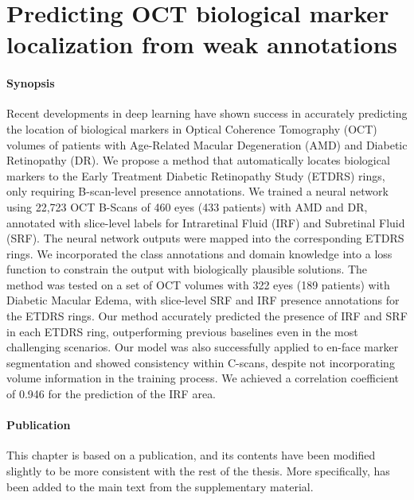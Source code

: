 \graphicspath{{ch3_oct_localization/}{Figures/}}

\chapter{Predicting OCT biological marker localization from weak annotations}
\label{chapter:oct}


\subsubsection{Synopsis}Recent developments in deep learning have shown success in accurately predicting the location of biological markers in Optical Coherence Tomography (OCT) volumes of patients with Age-Related Macular Degeneration (AMD) and Diabetic Retinopathy (DR). We propose a method that automatically locates biological markers to the Early Treatment Diabetic Retinopathy Study (ETDRS) rings, only requiring B-scan-level presence annotations. We trained a neural network using 22,723 OCT B-Scans of 460 eyes (433 patients) with AMD and DR, annotated with slice-level labels for Intraretinal Fluid (IRF) and Subretinal Fluid (SRF). The neural network outputs were mapped into the corresponding ETDRS rings. We incorporated the class annotations and domain knowledge into a loss function to constrain the output with biologically plausible solutions. The method was tested on a set of OCT volumes with 322 eyes (189 patients) with Diabetic Macular Edema, with slice-level SRF and IRF presence annotations for the ETDRS rings. Our method accurately predicted the presence of IRF and SRF in each ETDRS ring, outperforming previous baselines even in the most challenging scenarios. Our model was also successfully applied to en-face marker segmentation and showed consistency within C-scans, despite not incorporating volume information in the training process. We achieved a correlation coefficient of 0.946 for the prediction of the IRF area. 

\subsubsection{Publication}This chapter is based on a publication, and its contents have been modified slightly to be more consistent with the rest of the thesis. More specifically,  has been added to the main text from the supplementary material.

